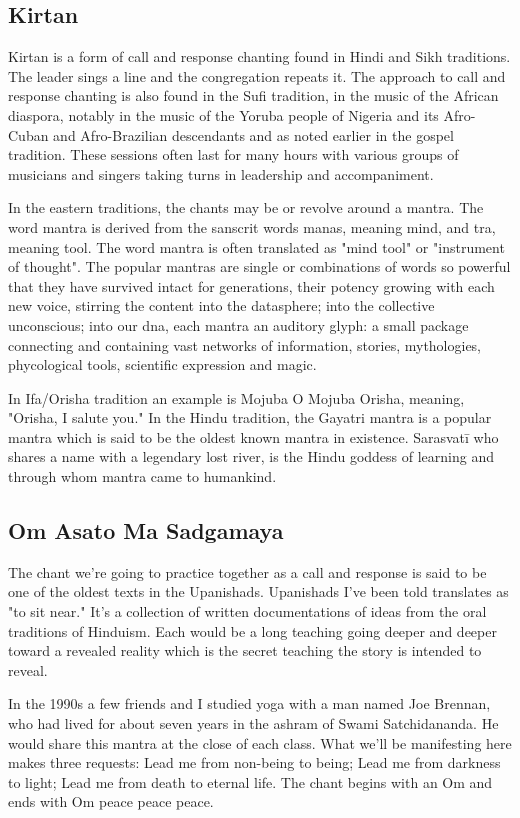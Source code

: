 \documentclass[12pt]{article}
\begin{document}
\subsection*{Kirtan}

Kirtan is a form of call and response chanting found in Hindi and Sikh traditions. The leader sings a line and the congregation repeats it. The approach to call and response chanting is also found in the Sufi tradition, in the music of the African diaspora, notably in the music of the Yoruba people of Nigeria and its Afro-Cuban and Afro-Brazilian descendants and as noted earlier in the gospel tradition. These sessions often last for many hours with various groups of musicians and singers taking turns in leadership and accompaniment.

In the eastern traditions, the chants may be or revolve around a mantra. The word mantra is derived from the sanscrit words manas, meaning mind, and tra, meaning tool. The word mantra is often translated as "mind tool" or "instrument of thought". The popular mantras are single or combinations of words so powerful that they have survived intact for generations, their potency growing with each new voice, stirring the content into the datasphere; into the collective unconscious; into our dna, each mantra an auditory glyph: a small package connecting and containing vast networks of information, stories, mythologies, phycological tools, scientific expression and magic.

In Ifa/Orisha tradition an example is Mojuba O Mojuba Orisha, meaning, "Orisha, I salute you." In the Hindu tradition, the Gayatri mantra is a popular mantra which is said to be the oldest known mantra in existence. Sarasvatī who shares a name with a legendary lost river, is the Hindu goddess of learning and through whom mantra came to humankind.

\subsection*{Om Asato Ma Sadgamaya}

The chant we're going to practice together as a call and response is said to be one of the oldest texts in the Upanishads. Upanishads I've been told translates as "to sit near." It's a collection of written documentations of ideas from the oral traditions of Hinduism. Each would be a long teaching going deeper and deeper toward a revealed reality which is the secret teaching the story is intended to reveal.

In the 1990s a few friends and I studied yoga with a man named Joe Brennan, who had lived for about seven years in the ashram of Swami Satchidananda. He would share this mantra at the close of each class. What we'll be manifesting here makes three requests: Lead me from non-being to being; Lead me from darkness to light; Lead me from death to eternal life. The chant begins with an Om and ends with Om peace peace peace.
\end{document}
